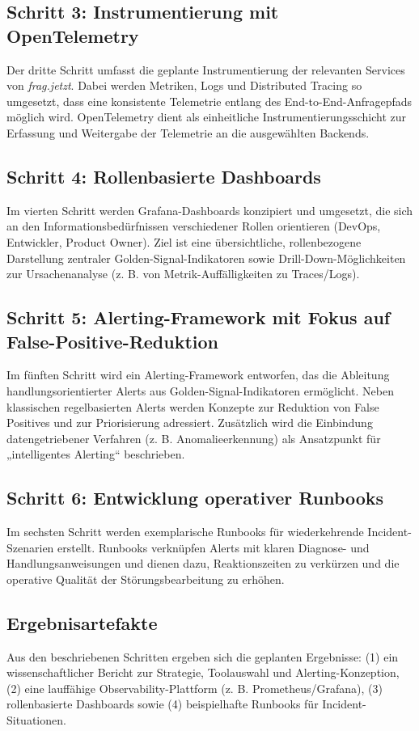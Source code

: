 \subsection{Schritt 3: Instrumentierung mit OpenTelemetry}
Der dritte Schritt umfasst die geplante Instrumentierung der relevanten Services von \emph{frag.jetzt}. Dabei werden Metriken, Logs und Distributed Tracing so umgesetzt, dass eine konsistente Telemetrie entlang des End-to-End-Anfragepfads möglich wird. OpenTelemetry dient als einheitliche Instrumentierungsschicht zur Erfassung und Weitergabe der Telemetrie an die ausgewählten Backends.

\subsection{Schritt 4: Rollenbasierte Dashboards}
Im vierten Schritt werden Grafana-Dashboards konzipiert und umgesetzt, die sich an den Informationsbedürfnissen verschiedener Rollen orientieren (DevOps, Entwickler, Product Owner). Ziel ist eine übersichtliche, rollenbezogene Darstellung zentraler Golden-Signal-Indikatoren sowie Drill-Down-Möglichkeiten zur Ursachenanalyse (z. B.  von Metrik-Auffälligkeiten zu Traces/Logs).

\subsection{Schritt 5: Alerting-Framework mit Fokus auf False-Positive-Reduktion}
Im fünften Schritt wird ein Alerting-Framework entworfen, das die Ableitung handlungsorientierter Alerts aus Golden-Signal-Indikatoren ermöglicht. Neben klassischen regelbasierten Alerts werden Konzepte zur Reduktion von False Positives und zur Priorisierung adressiert. Zusätzlich wird die Einbindung datengetriebener Verfahren (z. B.  Anomalieerkennung) als Ansatzpunkt für „intelligentes Alerting“ beschrieben.

\subsection{Schritt 6: Entwicklung operativer Runbooks}
Im sechsten Schritt werden exemplarische Runbooks für wiederkehrende Incident-Szenarien erstellt. Runbooks verknüpfen Alerts mit klaren Diagnose- und Handlungsanweisungen und dienen dazu, Reaktionszeiten zu verkürzen und die operative Qualität der Störungsbearbeitung zu erhöhen.

\subsection{Ergebnisartefakte}
Aus den beschriebenen Schritten ergeben sich die geplanten Ergebnisse: (1) ein wissenschaftlicher Bericht zur Strategie, Toolauswahl und Alerting-Konzeption, (2) eine lauffähige Observability-Plattform (z. B.  Prometheus/Grafana), (3) rollenbasierte Dashboards sowie (4) beispielhafte Runbooks für Incident-Situationen.



